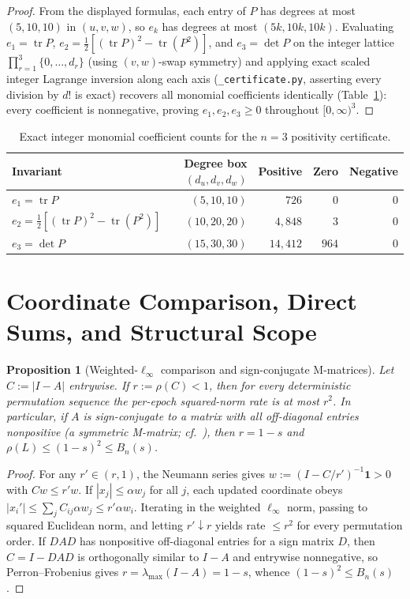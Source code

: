 \documentclass[11pt]{article}
\theoremstyle{plain}
\newtheorem{proposition}[theorem]{Proposition}
\theoremstyle{definition}
\theoremstyle{remark}
\DeclareMathOperator{\tr}{tr}
\begin{document}
\begin{proof}
From the displayed formulas, each entry of $P$ has degrees at most $(5, 10, 10)$ in $(u, v, w)$, so $e_k$ has degrees at most $(5k, 10k, 10k)$.
Evaluating $e_1 = \tr P$, $e_2 = \frac{1}{2}[(\tr P)^2 - \tr(P^2)]$, and $e_3 = \det P$ on the integer lattice $\prod_{r=1}^3 \{0, \dots, d_r\}$ (using $(v, w)$-swap symmetry) and applying exact scaled integer Lagrange inversion along each axis (\texttt{\_certificate.py}, asserting every division by $d!$ is exact) recovers all monomial coefficients identically (Table~\ref{tab:cert}): every coefficient is nonnegative, proving $e_1, e_2, e_3 \ge 0$ throughout $[0, \infty)^3$.
\end{proof}

\begin{table}[h]
\centering
\begin{tabular}{@{}lrrrr@{}}
\toprule
Invariant & Degree box $(d_u, d_v, d_w)$ & Positive & Zero & Negative \\
\midrule
$e_1 = \tr P$ & $(5, 10, 10)$ & $726$ & $0$ & $0$ \\
$e_2 = \frac{1}{2}[(\tr P)^2 - \tr(P^2)]$ & $(10, 20, 20)$ & $4{,}848$ & $3$ & $0$ \\
$e_3 = \det P$ & $(15, 30, 30)$ & $14{,}412$ & $964$ & $0$ \\
\bottomrule
\end{tabular}
\caption{Exact integer monomial coefficient counts for the $n = 3$ positivity certificate.}\label{tab:cert}
\end{table}

\section{Coordinate Comparison, Direct Sums, and Structural Scope}

\begin{proposition}[Weighted-$\ell_\infty$ comparison and sign-conjugate M-matrices]\label{prop:mmat}
Let $C := |I - A|$ entrywise.
If $r := \rho(C) < 1$, then for every deterministic permutation sequence the per-epoch squared-norm rate is at most $r^2$.
In particular, if $A$ is sign-conjugate to a matrix with all off-diagonal entries nonpositive (a symmetric M-matrix; cf.~\cite{Varga2000}), then $r = 1 - s$ and $\rho(L) \le (1 - s)^2 \le B_n(s)$.
\end{proposition}

\begin{proof}
For any $r' \in (r, 1)$, the Neumann series gives $w := (I - C/r')^{-1}\mathbf{1} > 0$ with $Cw \le r' w$.
If $|x_j| \le \alpha w_j$ for all $j$, each updated coordinate obeys $|x_i'| \le \sum_j C_{ij}\alpha w_j \le r'\alpha w_i$.
Iterating in the weighted $\ell_\infty$ norm, passing to squared Euclidean norm, and letting $r' \downarrow r$ yields rate $\le r^2$ for every permutation order.
If $DAD$ has nonpositive off-diagonal entries for a sign matrix $D$, then $C = I - DAD$ is orthogonally similar to $I - A$ and entrywise nonnegative, so Perron--Frobenius gives $r = \lambda_{\max}(I - A) = 1 - s$, whence $(1 - s)^2 \le B_n(s)$.
\end{proof}
\end{document}
